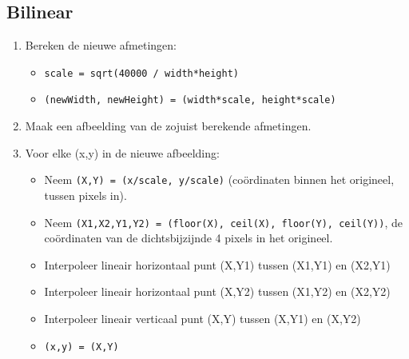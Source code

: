 \documentclass[a4paper]{article}
\begin{document}
\subsection{Bilinear}
\label{sec:orgb18fa54}
\begin{enumerate}
\item Bereken de nieuwe afmetingen:
\begin{itemize}
\item \texttt{scale = sqrt(40000 / width*height)}
\item \texttt{(newWidth, newHeight) = (width*scale, height*scale)}
\end{itemize}
\item Maak een afbeelding van de zojuist berekende afmetingen.
\item Voor elke (x,y) in de nieuwe afbeelding:
\begin{itemize}
\item Neem \texttt{(X,Y) = (x/scale, y/scale)} (coördinaten binnen het
origineel, tussen pixels in).
\item Neem \texttt{(X1,X2,Y1,Y2) = (floor(X), ceil(X), floor(Y), ceil(Y))}, de
coördinaten van de dichtsbijzijnde 4 pixels in het origineel.
\item Interpoleer lineair horizontaal punt (X,Y1) tussen (X1,Y1) en (X2,Y1)
\item Interpoleer lineair horizontaal punt (X,Y2) tussen (X1,Y2) en (X2,Y2)
\item Interpoleer lineair verticaal punt (X,Y) tussen (X,Y1) en (X,Y2)
\item \texttt{(x,y) = (X,Y)}
\end{itemize}
\end{enumerate}
\end{document}
